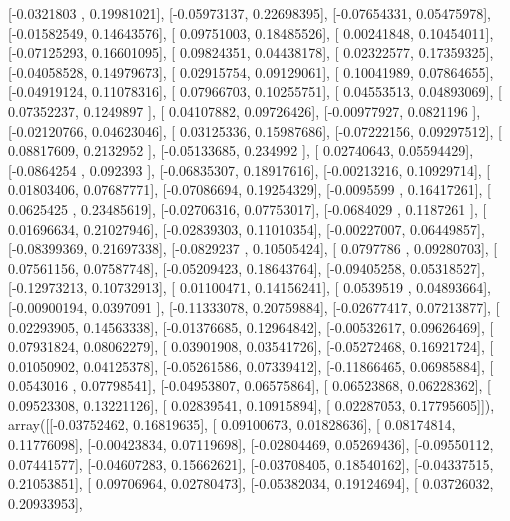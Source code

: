 \documentclass{article}
\begin{document}
       [-0.0321803 ,  0.19981021],
       [-0.05973137,  0.22698395],
       [-0.07654331,  0.05475978],
       [-0.01582549,  0.14643576],
       [ 0.09751003,  0.18485526],
       [ 0.00241848,  0.10454011],
       [-0.07125293,  0.16601095],
       [ 0.09824351,  0.04438178],
       [ 0.02322577,  0.17359325],
       [-0.04058528,  0.14979673],
       [ 0.02915754,  0.09129061],
       [ 0.10041989,  0.07864655],
       [-0.04919124,  0.11078316],
       [ 0.07966703,  0.10255751],
       [ 0.04553513,  0.04893069],
       [ 0.07352237,  0.1249897 ],
       [ 0.04107882,  0.09726426],
       [-0.00977927,  0.0821196 ],
       [-0.02120766,  0.04623046],
       [ 0.03125336,  0.15987686],
       [-0.07222156,  0.09297512],
       [ 0.08817609,  0.2132952 ],
       [-0.05133685,  0.234992  ],
       [ 0.02740643,  0.05594429],
       [-0.0864254 ,  0.092393  ],
       [-0.06835307,  0.18917616],
       [-0.00213216,  0.10929714],
       [ 0.01803406,  0.07687771],
       [-0.07086694,  0.19254329],
       [-0.0095599 ,  0.16417261],
       [ 0.0625425 ,  0.23485619],
       [-0.02706316,  0.07753017],
       [-0.0684029 ,  0.1187261 ],
       [ 0.01696634,  0.21027946],
       [-0.02839303,  0.11010354],
       [-0.00227007,  0.06449857],
       [-0.08399369,  0.21697338],
       [-0.0829237 ,  0.10505424],
       [ 0.0797786 ,  0.09280703],
       [ 0.07561156,  0.07587748],
       [-0.05209423,  0.18643764],
       [-0.09405258,  0.05318527],
       [-0.12973213,  0.10732913],
       [ 0.01100471,  0.14156241],
       [ 0.0539519 ,  0.04893664],
       [-0.00900194,  0.0397091 ],
       [-0.11333078,  0.20759884],
       [-0.02677417,  0.07213877],
       [ 0.02293905,  0.14563338],
       [-0.01376685,  0.12964842],
       [-0.00532617,  0.09626469],
       [ 0.07931824,  0.08062279],
       [ 0.03901908,  0.03541726],
       [-0.05272468,  0.16921724],
       [ 0.01050902,  0.04125378],
       [-0.05261586,  0.07339412],
       [-0.11866465,  0.06985884],
       [ 0.0543016 ,  0.07798541],
       [-0.04953807,  0.06575864],
       [ 0.06523868,  0.06228362],
       [ 0.09523308,  0.13221126],
       [ 0.02839541,  0.10915894],
       [ 0.02287053,  0.17795605]]), array([[-0.03752462,  0.16819635],
       [ 0.09100673,  0.01828636],
       [ 0.08174814,  0.11776098],
       [-0.00423834,  0.07119698],
       [-0.02804469,  0.05269436],
       [-0.09550112,  0.07441577],
       [-0.04607283,  0.15662621],
       [-0.03708405,  0.18540162],
       [-0.04337515,  0.21053851],
       [ 0.09706964,  0.02780473],
       [-0.05382034,  0.19124694],
       [ 0.03726032,  0.20933953],
\end{document}
